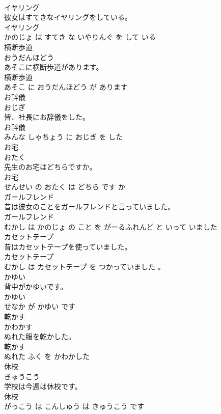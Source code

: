 \documentclass[8pt]{extreport}
\begin{document}
\begin{CJK}{UTF8}{min}
\\	イヤリング	
\\	彼女はすてきなイヤリングをしている。	
\\	イヤリング 
\\	かのじょ は すてき な いやりんぐ を して いる			
\\	横断歩道	
\\	おうだんほどう			
\\	あそこに横断歩道があります。	
\\	横断歩道 
\\	あそこ に おうだんほどう が あります			
\\	お辞儀	
\\	おじぎ			
\\	皆、社長にお辞儀をした。	
\\	お辞儀 
\\	みんな しゃちょう に おじぎ を した			
\\	お宅	
\\	おたく			
\\	先生のお宅はどちらですか。	
\\	お宅 
\\	せんせい の おたく は どちら です か			
\\	ガールフレンド	
\\	昔は彼女のことをガールフレンドと言っていました。	
\\	ガールフレンド 
\\	むかし は かのじょ の こと を がーるふれんど と いって いました			
\\	カセットテープ	
\\	昔はカセットテープを使っていました。	
\\	カセットテープ 
\\	むかし は カセットテープ を つかっていました 。			
\\	かゆい	
\\	背中がかゆいです。	
\\	かゆい 
\\	せなか が かゆい です			
\\	乾かす	
\\	かわかす			
\\	ぬれた服を乾かした。	
\\	乾かす 
\\	ぬれた ふく を かわかした			
\\	休校	
\\	きゅうこう			
\\	学校は今週は休校です。	
\\	休校 
\\	がっこう は こんしゅう は きゅうこう です			

\end{CJK}
\end{document}
